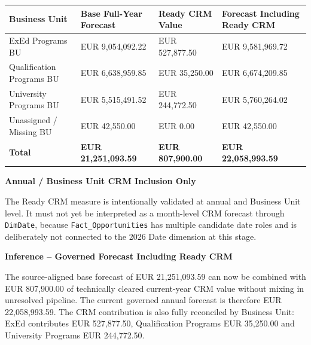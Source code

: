 \documentclass[11pt,a4paper]{article}
\begin{document}
\begin{tabularx}{\textwidth}{
    >{\raggedright\arraybackslash}p{4.2cm}
    >{\raggedleft\arraybackslash}p{3.2cm}
    >{\raggedleft\arraybackslash}p{3.2cm}
    >{\raggedleft\arraybackslash}X
}

\toprule

Business Unit
&
Base Full-Year Forecast
&
Ready CRM Value
&
Forecast Including Ready CRM
\\

\midrule

ExEd Programs BU
&
EUR 9,054,092.22
&
EUR 527,877.50
&
EUR 9,581,969.72
\\

Qualification Programs BU
&
EUR 6,638,959.85
&
EUR 35,250.00
&
EUR 6,674,209.85
\\

University Programs BU
&
EUR 5,515,491.52
&
EUR 244,772.50
&
EUR 5,760,264.02
\\

Unassigned / Missing BU
&
EUR 42,550.00
&
EUR 0.00
&
EUR 42,550.00
\\

\midrule

\textbf{Total}
&
\textbf{EUR 21,251,093.59}
&
\textbf{EUR 807,900.00}
&
\textbf{EUR 22,058,993.59}
\\

\bottomrule

\end{tabularx}

\begin{warningbox}

\textbf{Annual / Business Unit CRM Inclusion Only}

The Ready CRM measure is intentionally validated at annual and Business Unit
level. It must not yet be interpreted as a month-level CRM forecast through
\texttt{DimDate}, because \texttt{Fact\_Opportunities} has multiple candidate
date roles and is deliberately not connected to the 2026 Date dimension at this
stage.

\end{warningbox}

\begin{inferencebox}

\textbf{Inference -- Governed Forecast Including Ready CRM}

The source-aligned base forecast of EUR 21,251,093.59 can now be combined with
EUR 807,900.00 of technically cleared current-year CRM value without mixing in
unresolved pipeline. The current governed annual forecast is therefore
EUR 22,058,993.59. The CRM contribution is also fully reconciled by Business
Unit: ExEd contributes EUR 527,877.50, Qualification Programs EUR 35,250.00 and
University Programs EUR 244,772.50.

\end{inferencebox}
\end{document}
